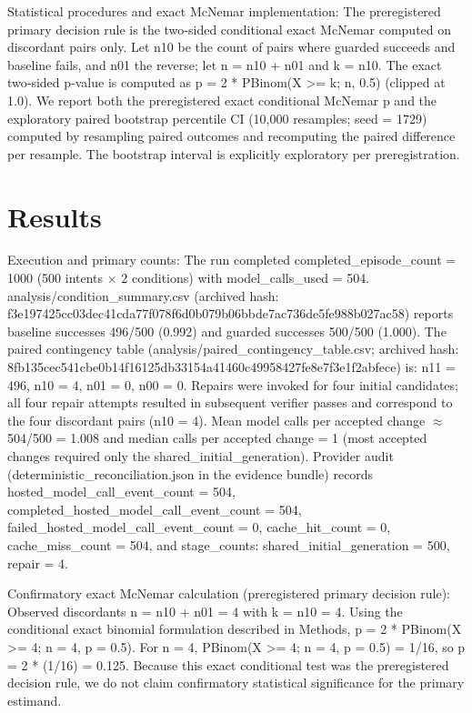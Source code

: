 \documentclass[conference]{IEEEtran}
\begin{document}
Statistical procedures and exact McNemar implementation: The preregistered primary decision rule is the two‑sided conditional exact McNemar computed on discordant pairs only. Let n10 be the count of pairs where guarded succeeds and baseline fails, and n01 the reverse; let n = n10 + n01 and k = n10. The exact two‑sided p‑value is computed as p = 2 * PBinom(X >= k; n, 0.5) (clipped at 1.0). We report both the preregistered exact conditional McNemar p and the exploratory paired bootstrap percentile CI (10,000 resamples; seed = 1729) computed by resampling paired outcomes and recomputing the paired difference per resample. The bootstrap interval is explicitly exploratory per preregistration.

\section{Results}
Execution and primary counts: The run completed completed\_episode\_count = 1000 (500 intents \ensuremath{\times} 2 conditions) with model\_calls\_used = 504. analysis/condition\_summary.csv (archived hash: f3e19742\allowbreak{}5cc03dec\allowbreak{}41cda77f\allowbreak{}078f6d0b\allowbreak{}079b06bb\allowbreak{}de7ac736\allowbreak{}de5fe988\allowbreak{}b027ac58) reports baseline successes 496/500 (0.992) and guarded successes 500/500 (1.000). The paired contingency table (analysis/paired\_contingency\_table.csv; archived hash: 8fb135ce\allowbreak{}c541cbe0\allowbreak{}b14f1612\allowbreak{}5db33154\allowbreak{}a41460c4\allowbreak{}9958427f\allowbreak{}e8e7f3e1\allowbreak{}f2abfece) is: n11 = 496, n10 = 4, n01 = 0, n00 = 0. Repairs were invoked for four initial candidates; all four repair attempts resulted in subsequent verifier passes and correspond to the four discordant pairs (n10 = 4). Mean model calls per accepted change \ensuremath{\approx} 504/500 = 1.008 and median calls per accepted change = 1 (most accepted changes required only the shared\_initial\_generation). Provider audit (deterministic\_reconciliation.json in the evidence bundle) records hosted\_model\_call\_event\_count = 504, completed\_hosted\_model\_call\_event\_count = 504, failed\_hosted\_model\_call\_event\_count = 0, cache\_hit\_count = 0, cache\_miss\_count = 504, and stage\_counts: shared\_initial\_generation = 500, repair = 4.

Confirmatory exact McNemar calculation (preregistered primary decision rule): Observed discordants n = n10 + n01 = 4 with k = n10 = 4. Using the conditional exact binomial formulation described in Methods, p = 2 * PBinom(X >= 4; n = 4, p = 0.5). For n = 4, PBinom(X >= 4; n = 4, p = 0.5) = 1/16, so p = 2 * (1/16) = 0.125. Because this exact conditional test was the preregistered decision rule, we do not claim confirmatory statistical significance for the primary estimand.
\end{document}
